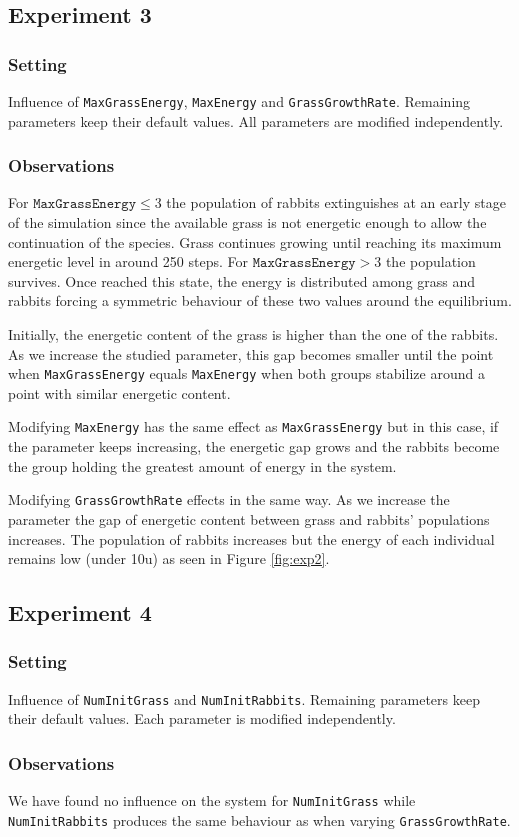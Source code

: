 \documentclass[11pt]{article}
\begin{document}
\subsection{Experiment 3}
\subsubsection{Setting}

Influence of \texttt{MaxGrassEnergy}, \texttt{MaxEnergy} and \texttt{GrassGrowthRate}. Remaining parameters keep their default values. All parameters are modified independently. 

\subsubsection{Observations}

For $\texttt{MaxGrassEnergy} \leq 3$ the population of rabbits extinguishes at an early stage of the simulation since the available grass is not energetic enough to allow the continuation of the species. Grass continues growing until reaching its maximum energetic level in around 250 steps. For $\texttt{MaxGrassEnergy} > 3$ the population survives. Once reached this state, the energy is distributed among grass and rabbits forcing a symmetric behaviour of these two values around the equilibrium.

Initially, the energetic content of the grass is higher than the one of the rabbits. As we increase the studied parameter, this gap becomes smaller until the point when \texttt{MaxGrassEnergy} equals \texttt{MaxEnergy} when both groups stabilize around a point with similar energetic content.

Modifying \texttt{MaxEnergy} has the same effect as \texttt{MaxGrassEnergy} but in this case, if the parameter keeps increasing, the energetic gap grows and the rabbits become the group holding the greatest amount of energy in the system. 

Modifying \texttt{GrassGrowthRate} effects in the same way. As we increase the parameter the gap of energetic content between grass and rabbits' populations increases. The population of rabbits increases but the energy of each individual remains low (under 10u) as seen in Figure \ref{fig:exp2}.

\subsection{Experiment 4} 
\subsubsection{Setting}
Influence of \texttt{NumInitGrass} and \texttt{NumInitRabbits}. Remaining parameters keep their default values. Each parameter is modified independently. 
\subsubsection{Observations}
We have found no influence on the system for \texttt{NumInitGrass} while \texttt{NumInitRabbits} produces the same behaviour as when varying \texttt{GrassGrowthRate}. 
\end{document}
